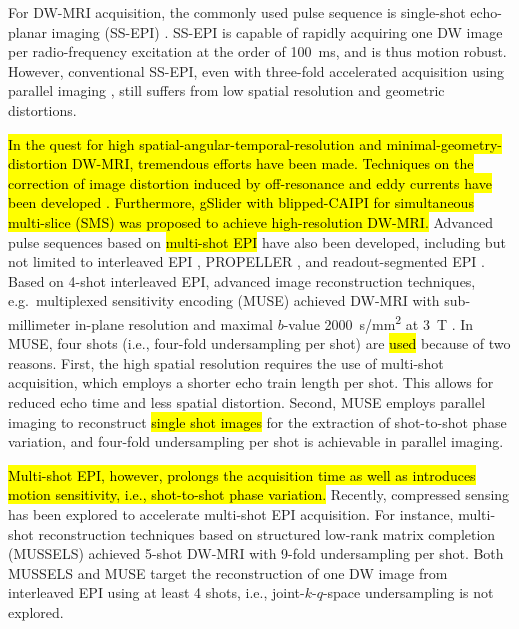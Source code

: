 \documentclass[preprint,12pt,authoryear,review]{elsarticle}
\begin{document}
    For DW-MRI acquisition, the commonly used pulse sequence is
    single-shot echo-planar imaging (SS-EPI) \citep{mansfield_1977_epi}.
    SS-EPI is capable of rapidly acquiring one DW image per radio-frequency excitation
    at the order of \SI{100}{\ms}, and is thus motion robust.
    However, conventional SS-EPI,
    even with three-fold accelerated acquisition \citep{bammer_2001_epi_sense}
    using parallel imaging
    \citep{roemer_1990_pi,ra_1993_sense,pruessmann_1999_sense,griswold_2002_grappa},
    still suffers from low spatial resolution and geometric distortions.

    \hl{In the quest for high spatial-angular-temporal-resolution
    and minimal-geometry-distortion DW-MRI,
    tremendous efforts have been made.
    Techniques on the correction of image distortion
    induced by off-resonance and eddy currents
    have been developed \mbox{\citep{andersson_2003_topup}}.
    Furthermore, gSlider \mbox{\citep{setsompop_2018_gslider}} with
    blipped-CAIPI \mbox{\citep{setsompop_2012_blipped}}
    for simultaneous multi-slice (SMS)
    \mbox{\citep{maudsley_1980_sms,breuer_2005_caipi}}
    was proposed to achieve high-resolution DW-MRI.}
    Advanced pulse sequences based on
    \hl{multi-shot EPI} have also been developed, 
    including but not limited to interleaved EPI \citep{butts_1993_iepi},
    PROPELLER \citep{pipe_2002_blade}, and
    readout-segmented EPI \citep{porter_2009_resolve,heidemann_2010_resolve7t}.
    Based on 4-shot interleaved EPI, advanced image reconstruction techniques,
    e.g.~multiplexed sensitivity encoding (MUSE)
    achieved DW-MRI with sub-millimeter in-plane resolution
    and maximal $b$-value \SI{2000}{s/mm^2} at \SI{3}{\tesla} \citep{chen_2013_muse}.
    In MUSE, four shots (i.e., four-fold undersampling per shot)
    are \hl{used} because of two reasons. 
    First, the high spatial resolution requires the use of multi-shot acquisition,
    which employs a shorter echo train length per shot.
    This allows for reduced echo time and less spatial distortion.
    Second, MUSE employs parallel imaging to reconstruct
    \hl{single shot images} 
    for the extraction of shot-to-shot phase variation,
    and four-fold undersampling per shot is achievable in parallel imaging.

    \hl{Multi-shot EPI, however, prolongs the acquisition time as well as
    introduces motion sensitivity, i.e., shot-to-shot phase variation.}
    Recently, compressed sensing \citep{lustig_2007_cs,block_2007_cs}
    has been explored to accelerate multi-shot EPI acquisition.
    For instance, multi-shot reconstruction techniques
    based on structured low-rank matrix completion (MUSSELS)
    \citep{mani_2017_mussels,bilgic_2019_neatr} achieved
    5-shot DW-MRI with 9-fold undersampling per shot.
    Both MUSSELS and MUSE target the reconstruction of one DW image
    from interleaved EPI using at least 4 shots,
    i.e., joint-$k$-$q$-space undersampling is not explored.
\end{document}
